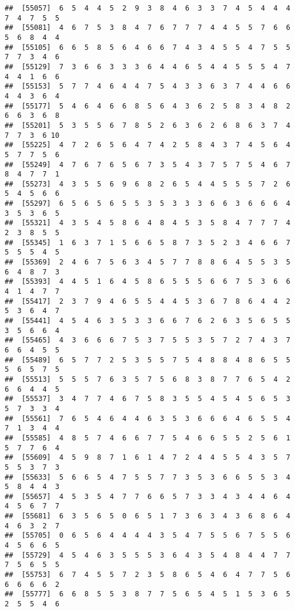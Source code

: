 \documentclass[
]{book}
\begin{document}
\begin{verbatim}
##  [55057]  6  5  4  4  5  2  9  3  8  4  6  3  3  7  4  5  4  4  4  7  4  7  5  5
##  [55081]  4  6  7  5  3  8  4  7  6  7  7  7  4  4  5  5  7  6  6  5  6  8  4  4
##  [55105]  6  6  5  8  5  6  4  6  6  7  4  3  4  5  5  4  7  5  5  7  7  3  4  6
##  [55129]  7  3  6  6  3  3  3  6  4  4  6  5  4  4  5  5  5  4  7  4  4  1  6  6
##  [55153]  5  7  7  4  6  4  4  7  5  4  3  3  6  3  7  4  4  6  6  4  4  3  6  4
##  [55177]  5  4  6  4  6  6  8  5  6  4  3  6  2  5  8  3  4  8  2  6  6  3  6  8
##  [55201]  5  3  5  5  6  7  8  5  2  6  3  6  2  6  8  6  3  7  4  7  7  3  6 10
##  [55225]  4  7  2  6  5  6  4  7  4  2  5  8  4  3  7  4  5  6  4  5  7  7  5  6
##  [55249]  4  7  6  7  6  5  6  7  3  5  4  3  7  5  7  5  4  6  7  8  4  7  7  1
##  [55273]  4  3  5  5  6  9  6  8  2  6  5  4  4  5  5  5  7  2  6  5  4  5  6  6
##  [55297]  6  5  6  5  6  5  5  3  5  3  3  3  6  6  3  6  6  6  4  3  5  3  6  5
##  [55321]  4  3  5  4  5  8  6  4  8  4  5  3  5  8  4  7  7  7  4  2  3  8  5  5
##  [55345]  1  6  3  7  1  5  6  6  5  8  7  3  5  2  3  4  6  6  7  5  5  5  4  5
##  [55369]  2  4  6  7  5  6  3  4  5  7  7  8  8  6  4  5  5  3  5  6  4  8  7  3
##  [55393]  4  4  5  1  6  4  5  8  6  5  5  5  6  6  7  5  3  6  6  4  1  4  7  7
##  [55417]  2  3  7  9  4  6  5  5  4  4  5  3  6  7  8  6  4  4  2  5  3  6  4  7
##  [55441]  4  5  4  6  3  5  3  3  6  6  7  6  2  6  3  5  6  5  5  3  5  6  6  4
##  [55465]  4  3  6  6  6  7  5  3  7  5  5  3  5  7  2  7  4  3  7  6  6  4  5  5
##  [55489]  6  5  7  7  2  5  3  5  5  7  5  4  8  8  4  8  6  5  5  5  6  5  7  5
##  [55513]  5  5  5  7  6  3  5  7  5  6  8  3  8  7  7  6  5  4  2  6  6  4  4  5
##  [55537]  3  4  7  7  4  6  7  5  8  3  5  5  4  5  4  5  6  5  3  5  7  3  3  4
##  [55561]  7  6  5  4  6  4  4  6  3  5  3  6  6  6  4  6  5  5  4  7  1  3  4  4
##  [55585]  4  8  5  7  4  6  6  7  7  5  4  6  6  5  5  2  5  6  1  5  7  7  6  4
##  [55609]  4  5  9  8  7  1  6  1  4  7  2  4  4  5  5  4  3  5  7  5  5  3  7  3
##  [55633]  5  6  6  5  4  7  5  5  7  7  3  5  3  6  6  5  5  3  4  5  8  4  4  3
##  [55657]  4  5  3  5  4  7  7  6  6  5  7  3  3  4  3  4  4  6  4  4  5  6  7  7
##  [55681]  6  3  5  6  5  0  6  5  1  7  3  6  3  4  3  6  8  6  4  4  6  3  2  7
##  [55705]  0  6  5  6  4  4  4  4  3  5  4  7  5  5  6  7  5  5  6  4  5  6  6  5
##  [55729]  4  5  4  6  3  5  5  5  3  6  4  3  5  4  8  4  4  7  7  7  5  6  5  5
##  [55753]  6  7  4  5  5  7  2  3  5  8  6  5  4  6  4  7  7  5  6  6  6  6  6  2
##  [55777]  6  6  8  5  5  3  8  7  7  5  6  5  4  5  1  5  3  6  5  2  5  5  4  6

\end{verbatim}
\end{document}
